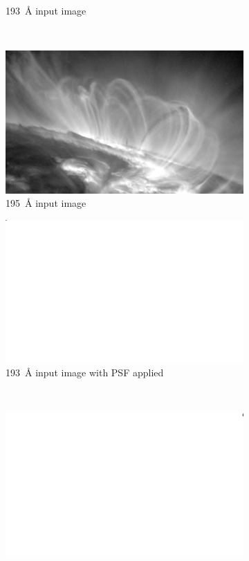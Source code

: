 \documentclass[10pt,letterpaper]{article}
\begin{document}
\begin{figure}[h!]
\begin{subfigure}[t]{0.49\textwidth}
						\caption{\SI{193}{\angstrom} input image}
						\label{193b}
					\end{subfigure}
					~
					\begin{subfigure}[t]{0.49\textwidth}
						\includegraphics[width=\textwidth]{psf/195/sun}	
						\caption{\SI{195}{\angstrom} input image}
						\label{195b}
					\end{subfigure}
					\begin{subfigure}[t]{0.49\textwidth}
						\includegraphics[width=\textwidth]{psf/193/img}
						\caption{\SI{193}{\angstrom} input image with PSF applied}
						\label{193c}
					\end{subfigure}
					~
					\begin{subfigure}[t]{0.49\textwidth}
						\includegraphics[width=\textwidth]{psf/195/img}	

\end{subfigure}
\end{figure}
\end{document}
